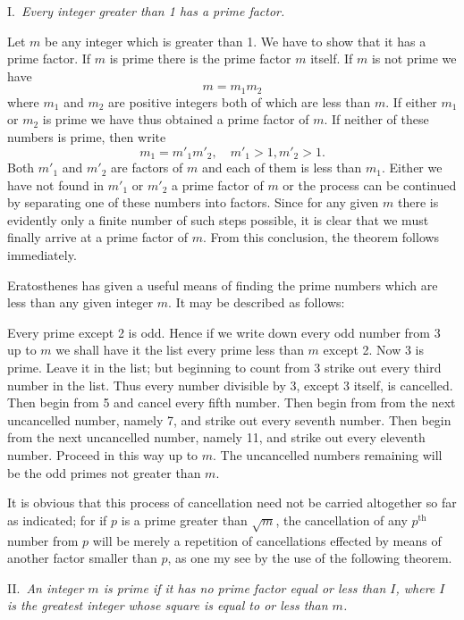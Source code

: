 \documentclass[oneside]{book}
\begin{document}
\smallskip I.~\emph{Every integer greater than 1 has a prime factor.}

Let $m$ be any integer which is greater than 1. We have to show that
it has a prime factor. If $m$ is prime there is the prime factor $m$
itself. If $m$ is not prime we have
\begin{equation*}
m = m_1 m_2
\end{equation*}
where $m_1$ and $m_2$ are positive integers both of which are less
than $m$. If either $m_1$ or $m_2$ is prime we have thus obtained a
prime factor of $m$. If neither of these numbers is prime, then
write
\begin{equation*}
m_1 = m'_1 m'_2,\quad m'_1 > 1, m'_2 > 1.
\end{equation*}
Both $m'_1$ and $m'_2$ are factors of $m$ and each of them is less
than $m_1$. Either we have not found in $m'_1$ or $m'_2$ a prime
factor of $m$ or the process can be continued by separating one of
these numbers into factors. Since for any given $m$ there is
evidently only a finite number of such steps possible, it is clear
that we must finally arrive at a prime factor of $m$. From this
conclusion, the theorem follows immediately.

Eratosthenes has given a useful means of finding the prime numbers
which are less than any given integer $m$. It may be described as
follows:

Every prime except 2 is odd. Hence if we write down every odd number
from 3 up to $m$ we shall have it the list every prime less than $m$
except 2. Now 3 is prime. Leave it in the list; but beginning to
count from 3 strike out every third number in the list. Thus every
number divisible by 3, except 3 itself, is cancelled. Then begin
from 5 and cancel every fifth number. Then begin from from the next
uncancelled number, namely 7, and strike out every seventh number.
Then begin from the next uncancelled number, namely 11, and strike
out every eleventh number. Proceed in this way up to $m$. The
uncancelled numbers remaining will be the odd primes not greater
than $m$.

It is obvious that this process of cancellation need not be carried
altogether so far as indicated; for if $p$ is a prime greater than
$\sqrt{m}$, the cancellation of any $p^\text{th}$ number from $p$
will be merely a repetition of cancellations effected by means of
another factor smaller than $p$, as one my see by the use of the
following theorem.

\smallskip II.~\emph{An integer $m$ is prime if it has no prime
factor equal or less than $I$, where $I$ is the greatest integer
whose square is equal to or less than $m$.}
\end{document}
